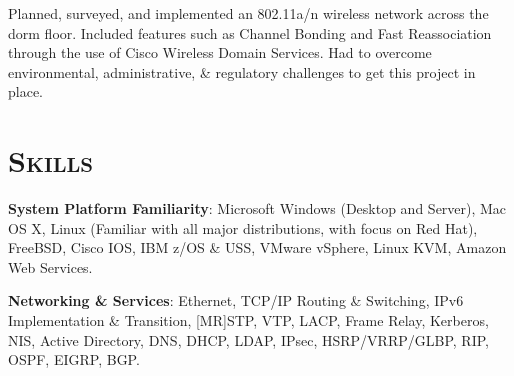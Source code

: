 \begin{resume}

\begin{position}
Planned, surveyed, and implemented an 802.11a/n wireless network across the dorm floor. Included features such as Channel Bonding and Fast Reassociation through the use of Cisco Wireless Domain Services. Had to overcome environmental, administrative, \& regulatory challenges to get this project in place. 
\end{position}





\section{\textsc{Skills}}

\textbf{System Platform Familiarity}: Microsoft Windows (Desktop and Server), Mac OS X, Linux (Familiar with all major distributions, with focus on Red Hat), FreeBSD, Cisco IOS, IBM z/OS \& USS, VMware vSphere, Linux KVM, Amazon Web Services.

\textbf{Networking \& Services}: Ethernet, TCP/IP Routing \& Switching, IPv6 Implementation \& Transition, [MR]STP, VTP, LACP, Frame Relay, Kerberos, NIS, Active Directory, DNS, DHCP, LDAP, IPsec, HSRP/VRRP/GLBP, RIP, OSPF, EIGRP, BGP.


\end{resume}
